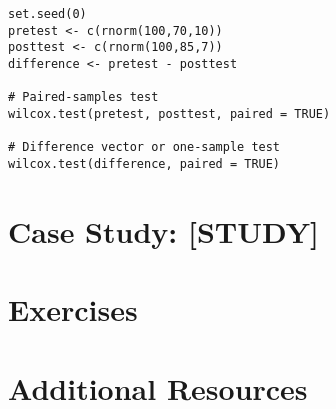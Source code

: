 \begin{framed}
\begin{Verbatim}[samepage=TRUE]
set.seed(0)
pretest <- c(rnorm(100,70,10))
posttest <- c(rnorm(100,85,7))
difference <- pretest - posttest

# Paired-samples test
wilcox.test(pretest, posttest, paired = TRUE)

# Difference vector or one-sample test
wilcox.test(difference, paired = TRUE)
\end{Verbatim}
\end{framed}

\section{Case Study: [STUDY]}

\section{Exercises}

\section{Additional Resources}

